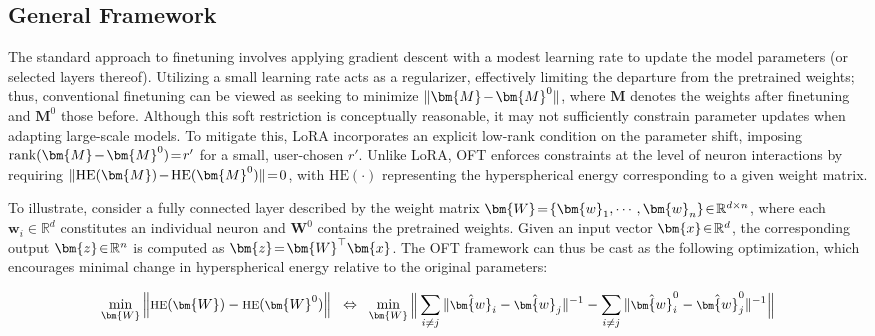 \subsection{General Framework}

The standard approach to finetuning involves applying gradient descent with a modest learning rate to update the model parameters (or selected layers thereof). Utilizing a small learning rate acts as a regularizer, effectively limiting the departure from the pretrained weights; thus, conventional finetuning can be viewed as seeking to minimize $\thickmuskip=2mu \medmuskip=2mu \| \bm{M} - \bm{M}^0\|$, where $\bm{M}$ denotes the weights after finetuning and $\bm{M}^0$ those before. Although this soft restriction is conceptually reasonable, it may not sufficiently constrain parameter updates when adapting large-scale models. To mitigate this, LoRA incorporates an explicit low-rank condition on the parameter shift, imposing $\thickmuskip=2mu \medmuskip=2mu \text{rank}(\bm{M} - \bm{M}^0)=r'$ for a small, user-chosen $r'$. Unlike LoRA, OFT enforces constraints at the level of neuron interactions by requiring $\thickmuskip=2mu \medmuskip=2mu \| \text{HE}(\bm{M})-\text{HE}(\bm{M}^0) \|=0$, with $\text{HE}(\cdot)$ representing the hyperspherical energy corresponding to a given weight matrix.

To illustrate, consider a fully connected layer described by the weight matrix $\thickmuskip=2mu \medmuskip=2mu \bm{W}=\{\bm{w}_1,\cdots,\bm{w}_n\}\in\mathbb{R}^{d\times n}$, where each $\bm{w}_i\in\mathbb{R}^{d}$ constitutes an individual neuron and $\bm{W}^0$ contains the pretrained weights. Given an input vector $\thickmuskip=2mu \medmuskip=2mu \bm{x}\in\mathbb{R}^d$, the corresponding output $\thickmuskip=2mu \medmuskip=2mu \bm{z}\in\mathbb{R}^n$ is computed as $\thickmuskip=2mu \medmuskip=2mu \bm{z}=\bm{W}^\top\bm{x}$. The OFT framework can thus be cast as the following optimization, which encourages minimal change in hyperspherical energy relative to the original parameters:

\begin{equation}\label{eq:oft_principle}
\footnotesize
\min_{\bm{W}} \left\| \text{HE}(\bm{W})-\text{HE}(\bm{W}^0)\right\|~~\Leftrightarrow~~\min_{\bm{W}} \bigg{\|} \sum_{i\neq j} \|\hat{\bm{w}}_i-\hat{\bm{w}}_j\|^{-1}-\sum_{i\neq j} \|\hat{\bm{w}}^0_i-\hat{\bm{w}}^0_j\|^{-1}\bigg{\|}
\end{equation}


